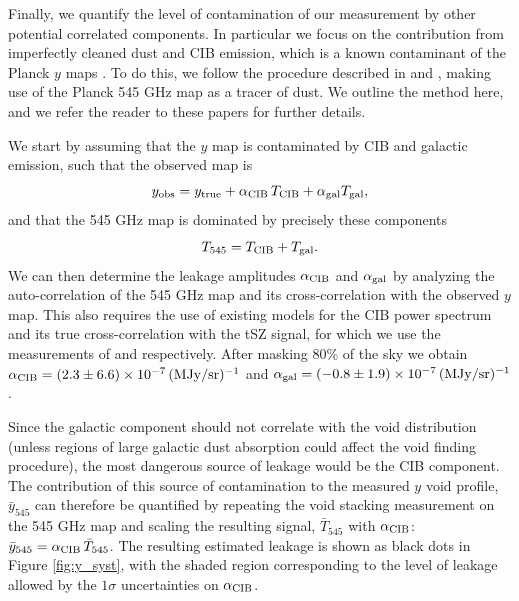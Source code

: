 \documentclass[twocolumn,amsfont,amssymb,amsmath, showpacs,balancelastpage, nofootinbib]{revtex4-1}
\newcommand{\DAM}[1]{{\color{red}{\bf DA: #1}}}
\begin{document}
      Finally, we quantify the level of contamination of our measurement by other
      potential correlated components. In particular we focus on the contribution from
      imperfectly cleaned dust and CIB emission, which is a known contaminant of the
      Planck $y$ maps \DAM{cites}. To do this, we follow the procedure described in
      \cite{2017MNRAS.467.2315V} and \cite{2014JCAP...02..030H}, making use of the
      Planck 545 GHz map as a tracer of dust. We outline the method here, and we
      refer the reader to these papers for further details.
      
      We start by assuming that the $y$ map is contaminated by CIB and galactic
      emission, such that the observed map is
      \begin{equation}
        y_{\rm obs}=y_{\rm true}+\alpha_{\rm CIB}\,T_{\rm CIB}+\alpha_{\rm gal}T_{\rm gal},
      \end{equation}
      and that the 545 GHz map is dominated by precisely these components
      \begin{equation}
        T_{\rm 545}=T_{\rm CIB}+T_{\rm gal}.
      \end{equation}
      We can then determine the leakage amplitudes $\alpha_{\rm CIB}$ and $\alpha_{\rm gal}$
      by analyzing the auto-correlation of the 545 GHz map and its cross-correlation with
      the observed $y$ map. This also requires the use of existing models for the
      CIB power spectrum and its true cross-correlation with the tSZ signal, for which
      we use the measurements of \cite{2014A&A...571A..30P} and \cite{2016A&A...594A..23P}
      respectively. After masking 80\% of the sky we obtain
      $\alpha_{\rm CIB}=(2.3\pm6.6)\times10^{-7}\,({\rm MJy/sr})^{-1}$ and
      $\alpha_{\rm gal}=(-0.8\pm1.9)\times10^{-7}\,({\rm MJy/sr})^{-1}$.
      
      Since the galactic component should not correlate with the void distribution (unless
      regions of large galactic dust absorption could affect the void finding procedure),
      the most dangerous source of leakage would be the CIB component. The contribution of
      this source of contamination to the measured $y$ void profile, $\bar{y}_{545}$ can
      therefore be quantified by repeating the void stacking measurement on the 545 GHz map and
      scaling the resulting signal, $\bar{T}_{545}$ with $\alpha_{\rm CIB}$:
      $\bar{y}_{545}=\alpha_{\rm CIB}\,\bar{T}_{545}$. The resulting estimated leakage is shown
      as black dots in Figure \ref{fig:y_syst}, with the shaded region corresponding to the 
      level of leakage allowed by the $1\sigma$ uncertainties on $\alpha_{\rm CIB}$.
      \DAM{Discuss more. Say that this agrees with the rough expectation based on naive
      cross-correlation.}
\end{document}
